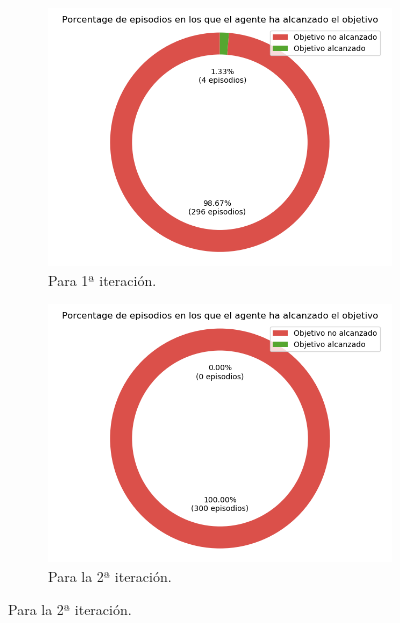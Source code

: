 \begin{figure}
    \centering
    \begin{subfigure}{.5\textwidth}
        \centering
        \includegraphics[scale=0.3]{cap5_experimentacion/images/CHANGE_GOAL-20_09-22_13-2, 1, 0_it1_porcentajeResuelto.png}
        \caption{Para 1ª iteración.}
        \label{fig:CHANGE_GOAL-20_09-22_13-2, 1, 0_it1_porcentajeResuelto}
    \end{subfigure}%
    \begin{subfigure}{.5\textwidth}
        \centering
        \includegraphics[scale=0.3]{cap5_experimentacion/images/CHANGE_GOAL-20_09-22_13-2, 1, 0_it2_porcentajeResuelto.png}
        \caption{Para la 2ª iteración.}
        \label{fig:CHANGE_GOAL-20_09-22_13-2, 1, 0_i2_porcentajeResuelto}

\end{subfigure}
\end{figure}
